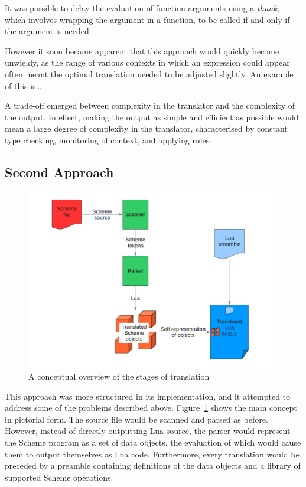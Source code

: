 It was possible to delay the evaluation of function arguments using a
\emph{thunk}, which involves wrapping the argument in a function, to be called
if and only if the argument is needed.

However it soon became apparent that this approach would quickly become
unwieldy, as the range of various contexts in which an expression could appear
often meant the optimal translation needed to be adjusted slightly. An example
of this is\ldots

A trade-off emerged between complexity in the translator and the complexity of
the output. In effect, making the output as simple and efficient as
possible would mean a large degree of complexity in the translator,
characterised by constant type checking, monitoring of context, and applying
rules.

\subsection{Second Approach}

\begin{figure}
\centering
\includegraphics[width=\textwidth]{overview.png}
\caption{A conceptual overview of the stages of translation}
\label{fig:overview}
\end{figure}

This approach was more structured in its implementation, and it attempted to
address some of the problems described above. Figure~\ref{fig:overview} shows
the main concept in pictorial form. The source file would be scanned and parsed
as before. However, instead of directly outputting Lua source, the parser would
represent the Scheme program as a set of data objects, the evaluation of which
would cause them to output themselves as Lua code. Furthermore, every
translation would be preceded by a preamble containing definitions of the data
objects and a library of supported Scheme operations.


